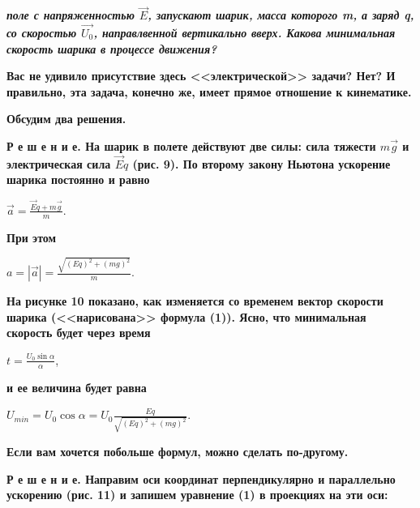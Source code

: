 \documentclass[a4paper,14pt]{article}
\begin{document}
\begin{multicols}{2}
        \noindent\textbf{\textit{поле с напряженностью $\vec{E}$, запускают шарик, масса которого m, а заряд q, со скоростью $\vec{U_0}$, направлвенной вертикально вверх. Какова минимальная скорость шарика в процессе движения?}}
        
        \textbf{Вас не удивило присутствие здесь <<электрической>> задачи? Нет? И правильно, эта задача, конечно же, имеет прямое отношение к кинематике.}
        
        \textbf{Обсудим два решения.}
        
        \textbf{Р е ш е н и е. На шарик в полете действуют две силы: сила тяжести $m\vec{g}$ и электрическая сила $\vec{E}q$ (рис. 9). По второму закону Ньютона ускорение шарика постоянно и равно}
        
        \begin{center}
            $\vec{a} = \frac{\vec{E}q + m\vec{g}}{m}$. 
        \end{center}
        
        \noindent\textbf{При этом}
        
        \begin{center}
            $a = |\vec{a}| = \frac{\sqrt{(Eq)^2 + (mg)^2}}{m}$. 
        \end{center}
        
        \noindent\textbf{На рисунке 10 показано, как изменяется со временем вектор скорости шарика (<<нарисована>> формула (1)). Ясно, что минимальная скорость будет через время}
        
        \begin{center}
            $t = \frac{U_0\sin{\alpha}}{\alpha}$,
        \end{center}
        
        \noindent\textbf{и ее величина будет равна}
        
        \begin{center}
            $U_{min} = U_0 \cos{\alpha} = U_0 \frac{Eq}{\sqrt{(Eq)^2 + (mg)^2}}$.
        \end{center}
        
        \textbf{Если вам хочется побольше формул, можно сделать по-другому.}
        
        \textbf{Р е ш е н и е. Направим оси координат перпендикулярно и параллельно ускорению (рис. 11) и запишем уравнение (1) в проекциях на эти оси:}
        
    \end{multicols}
    
\end{document}
